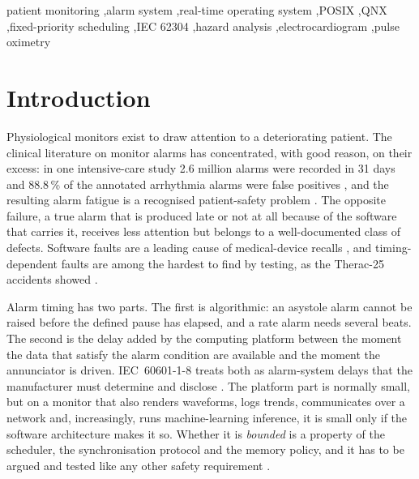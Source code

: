 \documentclass[preprint,3p,10pt]{elsarticle}
\begin{document}
\begin{frontmatter}
\begin{abstract}
\textbf{Conclusions.} Scheduling policy, not processing cost, dominates alarm-system latency under overload, and an application-level response-time bound accounts for only a small part of the worst observed latency on a virtualised general-purpose kernel. The simulator, its hazard log and the measurement harness are released to support reproduction on real-time operating systems.
\end{abstract}

\begin{keyword}
patient monitoring \sep alarm system \sep real-time operating system \sep POSIX \sep QNX \sep fixed-priority scheduling \sep IEC 62304 \sep hazard analysis \sep electrocardiogram \sep pulse oximetry
\end{keyword}
\end{frontmatter}

\section{Introduction}
Physiological monitors exist to draw attention to a deteriorating patient. The clinical literature on monitor alarms has concentrated, with good reason, on their excess: in one intensive-care study 2.6 million alarms were recorded in 31 days and 88.8\,\% of the annotated arrhythmia alarms were false positives \cite{drew2014}, and the resulting alarm fatigue is a recognised patient-safety problem \cite{cvach2012,clifford2015}. The opposite failure, a true alarm that is produced late or not at all because of the software that carries it, receives less attention but belongs to a well-documented class of defects. Software faults are a leading cause of medical-device recalls \cite{ronquillo2017,alemzadeh2013}, and timing-dependent faults are among the hardest to find by testing, as the Therac-25 accidents showed \cite{leveson1993}.

Alarm timing has two parts. The first is algorithmic: an asystole alarm cannot be raised before the defined pause has elapsed, and a rate alarm needs several beats. The second is the delay added by the computing platform between the moment the data that satisfy the alarm condition are available and the moment the annunciator is driven. IEC~60601-1-8 treats both as alarm-system delays that the manufacturer must determine and disclose \cite{iec6060118}. The platform part is normally small, but on a monitor that also renders waveforms, logs trends, communicates over a network and, increasingly, runs machine-learning inference, it is small only if the software architecture makes it so. Whether it is \emph{bounded} is a property of the scheduler, the synchronisation protocol and the memory policy, and it has to be argued and tested like any other safety requirement \cite{lee2012,hatcliff2014}.
\end{document}
